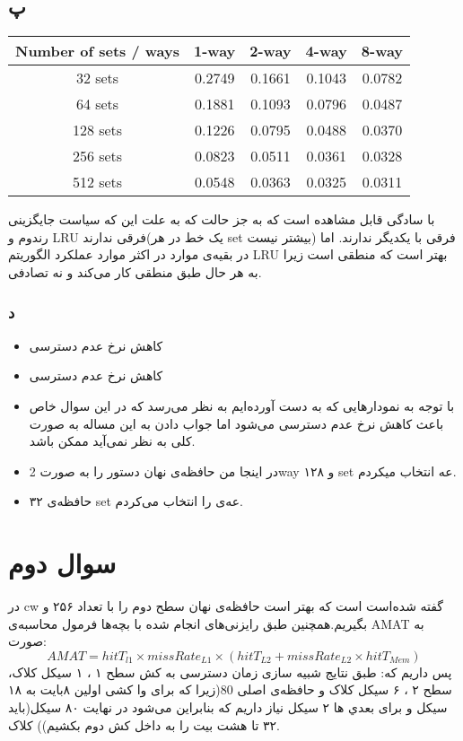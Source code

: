 \documentclass[11pt]{article}
\begin{document}
\subsection{پ}
\begin{latin}
\begin{center}
\begin{tabular}{|c|c|c|c|c|}
\hline
\rowcolor{black!30}
Number of sets / ways&1-way&2-way&4-way&8-way \\ \hline
32 sets	&0.2749&
0.1661&
0.1043&
0.0782 \\ \hline
64 sets	&0.1881&
0.1093&
0.0796&
0.0487 \\ \hline
128 sets&0.1226&
0.0795&
0.0488&
0.0370 \\ \hline
256 sets&0.0823&
0.0511&
0.0361&
0.0328 \\ \hline
512 sets&0.0548&
0.0363&
0.0325&
0.0311 \\ \hline
\end{tabular}
\end{center}
\end{latin}
با سادگی قابل مشاهده است که به جز حالت 
که به علت این که سیاست جایگزینی رندوم و LRU فرقی ندارند(یک خط در هر set بیشتر نیست) فرقی با یکدیگر ندارند. اما در بقیه‌ی موارد در اکثر موارد عملکرد الگوریتم LRU بهتر است که منطقی است زیرا به هر حال طبق منطقی کار می‌کند و نه تصادفی.
\subsubsection{د}
\begin{itemize}
\item کاهش نرخ عدم دسترسی
\item کاهش نرخ عدم دسترسی
\item با توجه به نمودار‌هایی که به دست آورده‌ایم به  نظر می‌رسد که در این سوال خاص باعث کاهش نرخ عدم دسترسی می‌شود اما جواب دادن به این مساله به صورت کلی به نظر نمی‌آید ممکن باشد.
\item در اینجا من حافظه‌ی نهان دستور را به صورت 2way 
و ۱۲۸ set عه انتخاب میکردم.
\item
حافظه‌ی ۳۲ set عه‌ی 
را انتخاب می‌کردم.
\end{itemize}
\section{سوال دوم}
در cw گفته‌ شده‌است است که بهتر است حافظه‌ی نهان سطح دوم را با تعداد ۲۵۶ و 
بگیریم.همچنین طبق رایزنی‌های انجام شده با بچه‌ها فرمول محاسبه‌ی 
AMAT
به صورت:
$$AMAT = hitT_{l1} \times missRate_{L1} \times (hitT_{L2} + missRate_{L2} \times hitT_{Mem})$$
پس داریم که:
طبق نتایج شبیه سازی زمان دسترسی به کش سطح ۱ ، ۱ سیکل کلاک، سطح ۲ ، ۶ سیکل کلاک و حافظه‌ی اصلی 80(زیرا که برای وا کشی اولین ۸بایت به ۱۸ سیکل و برای بعدي ها ۲ سیکل نیاز داریم که بنابراین می‌شود در نهایت ۸۰ سیکل(باید ۳۲ تا هشت بیت را به داخل کش دوم بکشیم)) کلاک.
\end{document}
